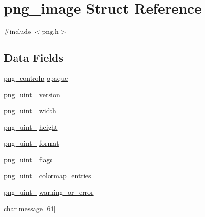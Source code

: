 \hypertarget{structpng__image}{}\section{png\+\_\+image Struct Reference}
\label{structpng__image}


{\ttfamily \#include $<$png.\+h$>$}

\subsection*{Data Fields}
\begin{DoxyCompactItemize}
\item 
\hyperlink{libpng16_2png_8h_a471eb31de97c923a5fb8b79708475c13}{png\+\_\+controlp} \hyperlink{structpng__image_a7b502596648744e2ee0c8788e2c6e918}{opaque}
\item 
\hyperlink{libpng16_2pngconf_8h_aed373ad2e16fd6df7ccfa96329441d0d}{png\+\_\+uint\+\_} \hyperlink{structpng__image_a8c276ba2922051ff0ff9175ab1e23ed1}{version}
\item 
\hyperlink{libpng16_2pngconf_8h_aed373ad2e16fd6df7ccfa96329441d0d}{png\+\_\+uint\+\_} \hyperlink{structpng__image_a72ec07853c82c632c2d7b3c68c62b659}{width}
\item 
\hyperlink{libpng16_2pngconf_8h_aed373ad2e16fd6df7ccfa96329441d0d}{png\+\_\+uint\+\_} \hyperlink{structpng__image_aaf3cb3eb97ee0938a5e870a96fd1fa48}{height}
\item 
\hyperlink{libpng16_2pngconf_8h_aed373ad2e16fd6df7ccfa96329441d0d}{png\+\_\+uint\+\_} \hyperlink{structpng__image_a8a7469310ce4682932b0bc94624f35d1}{format}
\item 
\hyperlink{libpng16_2pngconf_8h_aed373ad2e16fd6df7ccfa96329441d0d}{png\+\_\+uint\+\_} \hyperlink{structpng__image_ab9519ecd9acf79b507dad566cc3b379f}{flags}
\item 
\hyperlink{libpng16_2pngconf_8h_aed373ad2e16fd6df7ccfa96329441d0d}{png\+\_\+uint\+\_} \hyperlink{structpng__image_a48bf1c6518f03da900f41cd9aa5ae5b7}{colormap\+\_\+entries}
\item 
\hyperlink{libpng16_2pngconf_8h_aed373ad2e16fd6df7ccfa96329441d0d}{png\+\_\+uint\+\_} \hyperlink{structpng__image_a1b6e296964e81414b0a1cf232ffbcfce}{warning\+\_\+or\+\_\+error}
\item 
char \hyperlink{structpng__image_a79795885d73dff1a4aec1cbbb8a4c36f}{message} \mbox{[}64\mbox{]}
\end{DoxyCompactItemize}


